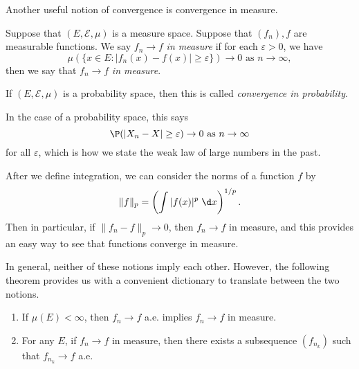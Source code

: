 \documentclass[a4paper]{article}
\begin{document}
Another useful notion of convergence is convergence in measure.
\begin{defi}
  Suppose that $(E, \mathcal{E}, \mu)$ is a measure space. Suppose that $(f_n), f$ are measurable functions. We say $f_n \to f$ \emph{in measure} if for each $\varepsilon > 0$, we have
  \[
    \mu(\{x \in E: |f_n(x) - f(x)| \geq \varepsilon\}) \to 0\text{ as } n \to \infty,
  \]
  then we say that $f_n \to f$ \emph{in measure}.

  If $(E, \mathcal{E}, \mu)$ is a probability space, then this is called \emph{convergence in probability}.
\end{defi}
In the case of a probability space, this says
\[
  \P(|X_n - X| \geq \varepsilon) \to 0\text{ as }n \to \infty
\]
for all $\varepsilon$, which is how we state the weak law of large numbers in the past.

After we define integration, we can consider the norms of a function $f$ by
\[
  \|f\|_p = \left(\int |f(x)|^p \;\d x\right)^{1/p}.
\]
Then in particular, if $\|f_n - f\|_p \to 0$, then $f_n \to f$ in measure, and this provides an easy way to see that functions converge in measure.

In general, neither of these notions imply each other. However, the following theorem provides us with a convenient dictionary to translate between the two notions.

\begin{thm}\leavevmode
  \begin{enumerate}
    \item If $\mu(E) < \infty$, then $f_n \to f$ a.e. implies $f_n \to f$ in measure.
    \item For any $E$, if $f_n \to f$ in measure, then there exists a subsequence $(f_{n_k})$ such that $f_{n_k} \to f$ a.e.
  \end{enumerate}
\end{thm}
\end{document}
